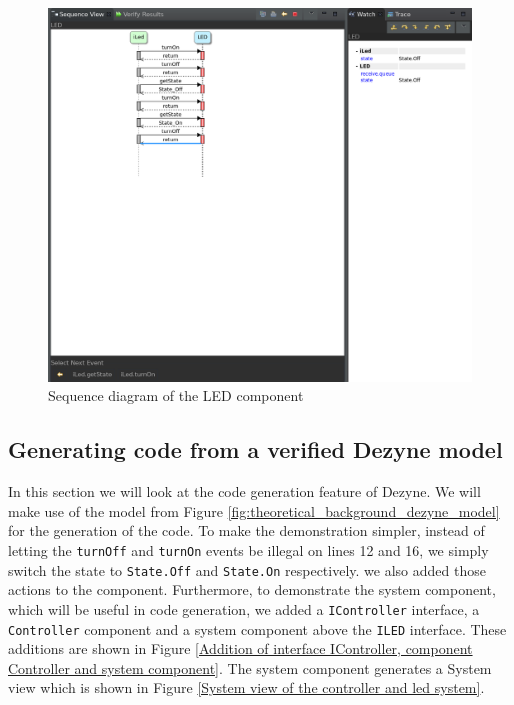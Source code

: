 \documentclass[12pt]{scrreprt}
\begin{document}
\begin{figure}[H]
    \centering
    \includegraphics[width=\textwidth]{Figures/theoretical_background/simulation_of_led.png}
    \caption{Sequence diagram of the LED component}
    \label{Sequence diagram of the LED component}
\end{figure}


\subsection{Generating code from a verified Dezyne model}
\label{Generating code from a verified Dezyne model}
    In this section we will look at the code generation feature of Dezyne. We will make use of the model from Figure \ref{fig:theoretical_background_dezyne_model} for the generation of the code. To make the demonstration simpler, instead of letting the \texttt{turnOff} and \texttt{turnOn} events be illegal on lines 12 and 16, we simply switch the state to \texttt{State.Off} and \texttt{State.On} respectively. we also added those actions to the component. Furthermore, to demonstrate the system component, which will be useful in code generation, we added a \texttt{IController} interface, a \texttt{Controller} component and a system component above the \texttt{ILED} interface. These additions are shown in Figure \ref{Addition of interface IController, component Controller and system component}. The system component generates a System view which is shown in Figure \ref{System view of the controller and led system}.
    
\end{document}
